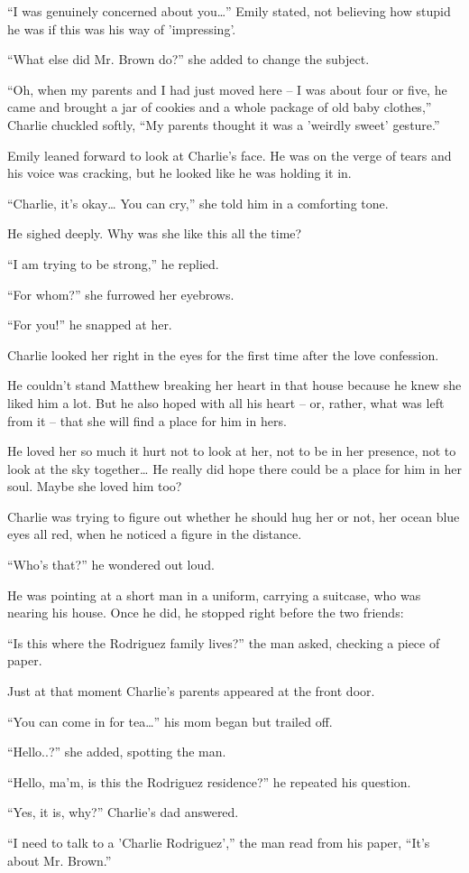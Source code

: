 “I was genuinely concerned about you…” Emily stated, not believing how stupid he was if this was his way of 'impressing'.

“What else did Mr. Brown do?” she added to change the subject.

“Oh, when my parents and I had just moved here – I was about four or five, he came and brought a jar of cookies and a whole package of old baby clothes,” Charlie chuckled softly, “My parents thought it was a 'weirdly sweet' gesture.”

Emily leaned forward to look at Charlie's face. He was on the verge of tears and his voice was cracking, but he looked like he was holding it in.

“Charlie, it's okay… You can cry,” she told him in a comforting tone.

He sighed deeply. Why was she like this all the time?

“I am trying to be strong,” he replied.

“For whom?” she furrowed her eyebrows.

“For you!” he snapped at her.

Charlie looked her right in the eyes for the first time after the love confession.

He couldn't stand Matthew breaking her heart in that house because he knew she liked him a lot. But he also hoped with all his heart – or, rather, what was left from it – that she will find a place for him in hers.

He loved her so much it hurt not to look at her, not to be in her presence, not to look at the sky together… He really did hope there could be a place for him in her soul. Maybe she loved him too?

Charlie was trying to figure out whether he should hug her or not, her ocean blue eyes all red, when he noticed a figure in the distance.

“Who's that?” he wondered out loud.

He was pointing at a short man in a uniform, carrying a suitcase, who was nearing his house. Once he did, he stopped right before the two friends:

“Is this where the Rodriguez family lives?” the man asked, checking a piece of paper.

Just at that moment Charlie's parents appeared at the front door.

“You can come in for tea…” his mom began but trailed off.

“Hello..?” she added, spotting the man.

“Hello, ma'm, is this the Rodriguez residence?” he repeated his question.

“Yes, it is, why?” Charlie's dad answered.

“I need to talk to a 'Charlie Rodriguez',” the man read from his paper, “It's about Mr. Brown.”